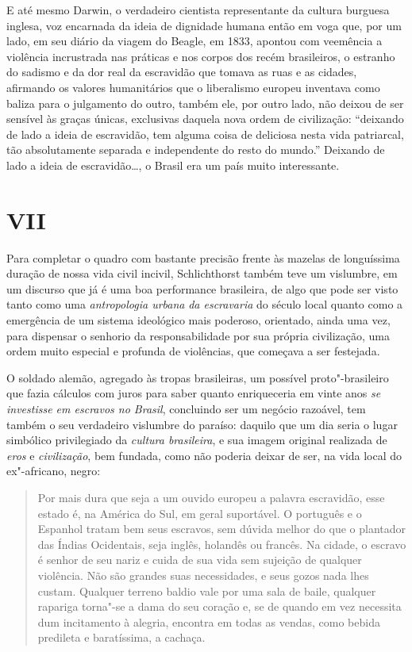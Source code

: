 E até mesmo Darwin, o verdadeiro cientista representante da cultura
burguesa inglesa, voz encarnada da ideia de dignidade humana então em
voga que, por um lado, em seu diário da viagem do Beagle, em 1833,
apontou com veemência a violência incrustrada nas práticas e nos corpos
dos recém brasileiros, o estranho do sadismo e da dor real da escravidão
que tomava as ruas e as cidades, afirmando os valores humanitários que o
liberalismo europeu inventava como baliza para o julgamento do outro,
também ele, por outro lado, não deixou de ser sensível às graças únicas,
exclusivas daquela nova ordem de civilização: ``deixando de lado a ideia
de escravidão, tem alguma coisa de deliciosa nesta vida patriarcal, tão
absolutamente separada e independente do resto do mundo.'' Deixando de
lado a ideia de escravidão\ldots{}, o Brasil era um país muito interessante.

\section{VII}

Para completar o quadro com bastante precisão frente às mazelas de
longuíssima duração de nossa vida civil incivil, Schlichthorst também
teve um vislumbre, em um discurso que já é uma boa performance
brasileira, de algo que pode ser visto tanto como uma \emph{antropologia
urbana} \emph{da escravaria} do século  local quanto como a
emergência de um sistema ideológico mais poderoso, orientado, ainda uma
vez, para dispensar o senhorio da responsabilidade por sua própria
civilização, uma ordem muito especial e profunda de violências, que
começava a ser festejada.

O soldado alemão, agregado às tropas brasileiras, um possível
proto"-brasileiro que fazia cálculos com juros para saber quanto
enriqueceria em vinte anos \emph{se investisse em escravos no Brasil},
concluindo ser um negócio razoável, tem também o seu verdadeiro
vislumbre do paraíso: daquilo que um dia seria o lugar simbólico
privilegiado da \emph{cultura brasileira}, e sua imagem original
realizada de \emph{eros} e \emph{civilização}, bem fundada, como não
poderia deixar de ser, na vida local do ex"-africano, negro:

\begin{quote}
Por mais dura que seja a um ouvido europeu a palavra escravidão, esse
estado é, na América do Sul, em geral suportável. O português e o
Espanhol tratam bem seus escravos, sem dúvida melhor do que o plantador
das Índias Ocidentais, seja inglês, holandês ou francês. Na cidade, o
escravo é senhor de seu nariz e cuida de sua vida sem sujeição de
qualquer violência. Não são grandes suas necessidades, e seus gozos nada
lhes custam. Qualquer terreno baldio vale por uma sala de baile,
qualquer rapariga torna"-se a dama do seu coração e, se de quando em vez
necessita dum incitamento à alegria, encontra em todas as vendas, como
bebida predileta e baratíssima, a cachaça.
\end{quote}

